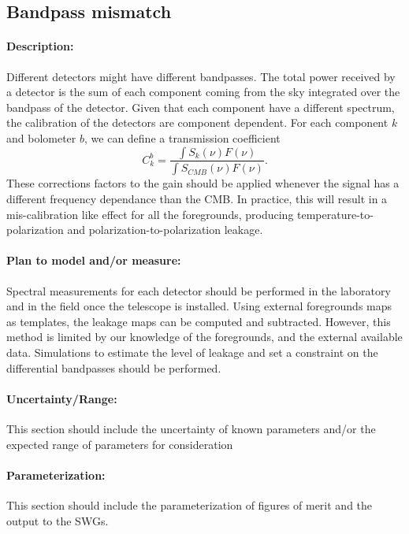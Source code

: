\subsection{Bandpass mismatch}

\paragraph{Description:}
Different detectors might have different bandpasses. The total power received by a detector is the sum of each component coming from the sky integrated over the bandpass of the detector. Given that each component have a different spectrum, the calibration of the detectors are component dependent. For each component $k$ and bolometer $b$, we can define a transmission coefficient
\begin{equation}
C_k^b = \frac{\int S_k(\nu) F(\nu)}{\int S_{CMB}(\nu) F(\nu)}.
\end{equation}
These corrections factors to the gain should be applied whenever the signal has a different frequency dependance than the CMB.
In practice, this will result in a mis-calibration like effect for all the foregrounds, producing temperature-to-polarization and polarization-to-polarization leakage. 


\paragraph{Plan to model and/or measure:}
Spectral measurements for each detector should be performed in the laboratory and in the field once the telescope is installed. Using external foregrounds maps as templates, the leakage maps can be computed and subtracted. However, this method is limited by our knowledge of the foregrounds, and the external available data. Simulations to estimate the level of leakage and set a constraint on the differential bandpasses should be performed.


\paragraph{Uncertainty/Range:}
This section should include the uncertainty of
known parameters and/or the expected range of parameters for consideration

\paragraph{Parameterization:}
This section should include the parameterization of figures of
merit and the output to the SWGs.
